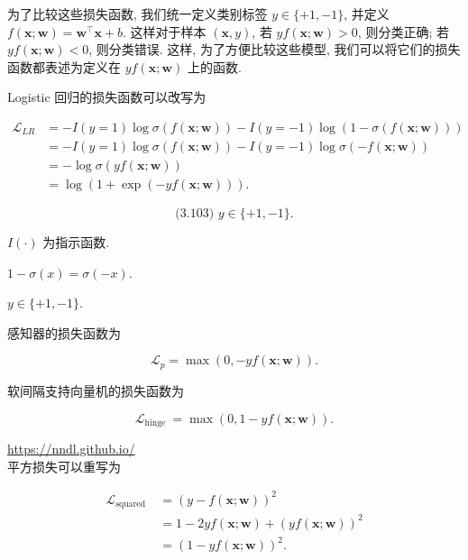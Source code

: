 \documentclass[10pt]{article}
\begin{document}
为了比较这些损失函数, 我们统一定义类别标签 $y \in\{+1,-1\}$, 并定义 $f(\boldsymbol{x} ; \boldsymbol{w})=\boldsymbol{w}^{\top} \boldsymbol{x}+b$. 这样对于样本 $(\boldsymbol{x}, y)$, 若 $y f(\boldsymbol{x} ; \boldsymbol{w})>0$, 则分类正确; 若 $y f(\boldsymbol{x} ; \boldsymbol{w})<0$, 则分类错误. 这样, 为了方便比较这些模型, 我们可以将它们的损失函数都表述为定义在 $y f(\boldsymbol{x} ; \boldsymbol{w})$ 上的函数.

Logistic 回归的损失函数可以改写为


\begin{align*}
\mathcal{L}_{L R} & =-I(y=1) \log \sigma(f(\boldsymbol{x} ; \boldsymbol{w}))-I(y=-1) \log (1-\sigma(f(\boldsymbol{x} ; \boldsymbol{w})))  \tag{3.101}\\
& =-I(y=1) \log \sigma(f(\boldsymbol{x} ; \boldsymbol{w}))-I(y=-1) \log \sigma(-f(\boldsymbol{x} ; \boldsymbol{w}))  \tag{3.102}\\
& =-\log \sigma(y f(\boldsymbol{x} ; \boldsymbol{w})) \\
& =\log (1+\exp (-y f(\boldsymbol{x} ; \boldsymbol{w}))) . \tag{3.104}
\end{align*}


$$
\text { (3.103) } y \in\{+1,-1\} \text {. }
$$

$I(\cdot)$ 为指示函数.

$1-\sigma(x)=\sigma(-x)$.

$y \in\{+1,-1\}$.

感知器的损失函数为


\begin{equation*}
\mathcal{L}_{p}=\max (0,-y f(\boldsymbol{x} ; \boldsymbol{w})) . \tag{3.105}
\end{equation*}


软间隔支持向量机的损失函数为


\begin{equation*}
\mathcal{L}_{\text {hinge }}=\max (0,1-y f(\boldsymbol{x} ; \boldsymbol{w})) . \tag{3.106}
\end{equation*}


\href{https://nndl.github.io/}{https://nndl.github.io/}\\
平方损失可以重写为


\begin{align*}
\mathcal{L}_{\text {squared }} & =(y-f(\boldsymbol{x} ; \boldsymbol{w}))^{2}  \tag{3.107}\\
& =1-2 y f(\boldsymbol{x} ; \boldsymbol{w})+(y f(\boldsymbol{x} ; \boldsymbol{w}))^{2}  \tag{3.108}\\
& =(1-y f(\boldsymbol{x} ; \boldsymbol{w}))^{2} . \tag{3.109}
\end{align*}
\end{document}
